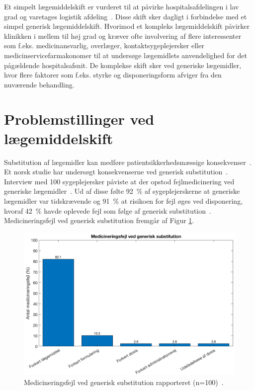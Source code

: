 Et simpelt lægemiddelskift er vurderet til at påvirke hospitalsafdelingen i lav grad og varetages logistik afdeling~\citep{Laegemiddelinformaion2017, Sygehusapoteket2017a}. Disse skift sker dagligt i forbindelse med et simpel generisk lægemiddelskift. Hvorimod et kompleks lægemiddelskift påvirker klinikken i mellem til høj grad og kræver ofte involvering af flere interessenter som f.eks. medicinansvarlig, overlæger, kontaktsygeplejersker eller medicinservicefarmakonomer til at undersøge lægemidlets anvendelighed for det pågældende hospitalsafsnit. 
De komplekse skift sker ved generiske lægemidler, hvor flere faktorer som f.eks. styrke og disponeringsform afviger fra den nuværende behandling.~\citep{Laegemiddelinformaion2017,Sygehusapoteket2017a}

\section{Problemstillinger ved lægemiddelskift}
Substitution af lægemidler kan medføre patientsikkerhedsmæssige konsekvenser~\citep{DanskSelskabforPatientsikkerhed2009}. Et norsk studie har undersøgt konsekvenserne ved generisk substitution~\citep{Hakonsen2010}. Interview med 100 sygeplejersker påviste at der opstod fejlmedicinering ved generiske lægemidler~\citep{Hakonsen2010}. Ud af disse følte 92~\% af sygeplejerskerne at generiske lægemidler var tidskrævende og 91~\% at risikoen for fejl øges ved disponering, hvoraf 42~\% havde oplevede fejl som følge af generisk substitution~\citep{Hakonsen2010}.
Medicineringsfejl ved generisk substitution fremgår af Figur \ref{fig:GeneriskSubstitution}.

\begin{figure}[H]\centering	\includegraphics[width=1\textwidth]{billeder/GenSub.png} 
	\caption{Medicineringsfejl ved generisk substitution rapporteret (n=100)~\citep{Hakonsen2010}.}
	\label{fig:GeneriskSubstitution}  
\end{figure}

